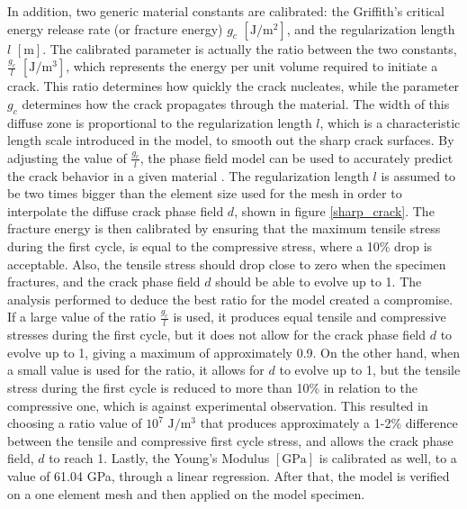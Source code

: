 \documentclass[11pt,a4paper]{article}
\begin{document}
\noindent In addition, two generic material constants are calibrated: the Griffith’s critical energy release rate (or fracture energy) $g_c$ $\left [\textrm{J}/\textrm{m}^\textrm{2} \right ]$, and the regularization length $l$ $\left [\textrm{m} \right ]$. The calibrated parameter is actually the ratio between the two constants, $\frac{g_c}{l}$ $\left [\textrm{J}/\textrm{m}^3 \right ]$, which represents the energy per unit volume required to initiate a crack. This ratio determines how quickly the crack nucleates, while the parameter $g_c$ determines how the crack propagates through the material. The width of this diffuse zone is proportional to the regularization length $l$, which is a characteristic length scale introduced in the model, to smooth out the sharp crack surfaces. By adjusting the value of $\frac{g_c}{l}$, the phase field model can be used to accurately predict the crack behavior in a given material \cite{miehe2010phase} \cite{kristensen2016assessment}. The regularization length $l$ is assumed to be two times bigger than the element size used for the mesh in order to interpolate the diffuse crack phase field $d$, shown in figure \ref{sharp_crack}. The fracture energy is then calibrated by ensuring that the maximum tensile stress during the first cycle, is equal to the compressive stress, where a 10\% drop is acceptable. Also, the tensile stress should drop close to zero when the specimen fractures, and the crack phase field $d$ should be able to evolve up to 1. The analysis performed to deduce the best ratio for the model created a compromise. If a large value of the ratio $\frac{g_c}{l}$ is used, it produces equal tensile and compressive stresses during the first cycle, but it does not allow for the crack phase field $d$ to evolve up to 1, giving a maximum of approximately 0.9. On the other hand, when a small value is used for the ratio, it allows for $d$ to evolve up to 1, but the tensile stress during the first cycle is reduced to more than 10\% in relation to the compressive one, which is against experimental observation. This resulted in choosing a ratio value of $10^7$ $\textrm{J}/\textrm{m}^3$ that produces approximately a 1-2\% difference between the tensile and compressive first cycle stress, and allows the crack phase field, $d$ to reach 1. Lastly, the Young's Modulus $\left [ \textrm{GPa} \right ]$ is calibrated as well, to a value of 61.04 GPa, through a linear regression. After that, the model is verified on a one element mesh and then applied on the model specimen.
\end{document}
